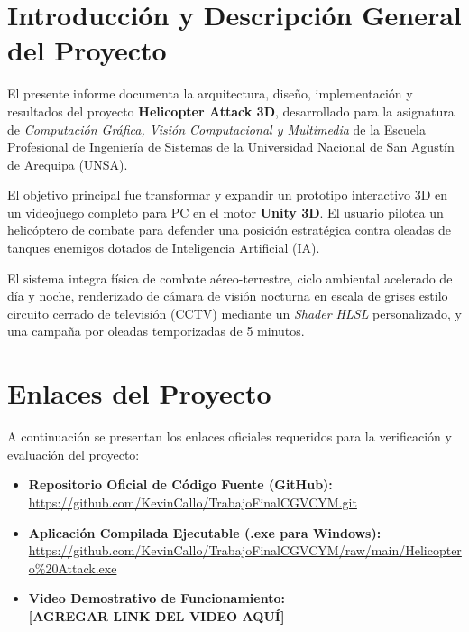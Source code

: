 \documentclass[12pt,a4paper]{article}
\begin{document}
\newpage
\tableofcontents
\newpage

\section{Introducción y Descripción General del Proyecto}

El presente informe documenta la arquitectura, diseño, implementación y resultados del proyecto \textbf{Helicopter Attack 3D}, desarrollado para la asignatura de \textit{Computación Gráfica, Visión Computacional y Multimedia} de la Escuela Profesional de Ingeniería de Sistemas de la Universidad Nacional de San Agustín de Arequipa (UNSA).

El objetivo principal fue transformar y expandir un prototipo interactivo 3D en un videojuego completo para PC en el motor \textbf{Unity 3D}. El usuario pilotea un helicóptero de combate para defender una posición estratégica contra oleadas de tanques enemigos dotados de Inteligencia Artificial (IA). 

El sistema integra física de combate aéreo-terrestre, ciclo ambiental acelerado de día y noche, renderizado de cámara de visión nocturna en escala de grises estilo circuito cerrado de televisión (CCTV) mediante un \textit{Shader HLSL} personalizado, y una campaña por oleadas temporizadas de 5 minutos.

\section{Enlaces del Proyecto}

A continuación se presentan los enlaces oficiales requeridos para la verificación y evaluación del proyecto:

\begin{itemize}
    \item \textbf{Repositorio Oficial de Código Fuente (GitHub):} \\
    \url{https://github.com/KevinCallo/TrabajoFinalCGVCYM.git}
    
    \item \textbf{Aplicación Compilada Ejecutable (.exe para Windows):} \\
    \url{https://github.com/KevinCallo/TrabajoFinalCGVCYM/raw/main/Helicoptero%20Attack.exe}
    
    \item \textbf{Video Demostrativo de Funcionamiento:} \\
    \textbf{[AGREGAR LINK DEL VIDEO AQUÍ]} %
\end{itemize}
\end{document}

